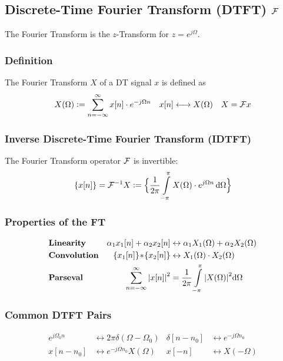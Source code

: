 \subsection{Discrete-Time Fourier Transform (DTFT) \texorpdfstring{\hfill $\mathcal{F}$}{ft}}
    The Fourier Transform is the $z$-Transform for $z=e^{j \Omega}$.
    \subsubsection{Definition}
        The Fourier Transform $X$ of a DT signal $x$ is defined as
        \begin{align*}
            X(\Omega) \vcentcolon= \sum\limits_{n = -\infty}^\infty x[n] \cdot e^{-j\Omega n} && x[n] \longleftrightarrow X(\Omega) && X = \mathcal{F} x
        \end{align*}

    \subsubsection{Inverse Discrete-Time Fourier Transform (IDTFT)}
        The Fourier Transform operator $\mathcal{F}$ is invertible:
        \begin{align*}
            \{x[n]\} = \mathcal{F}^{-1} X \vcentcolon= \Bigl\{ \frac{1}{2\pi}\int\limits_{-\pi}^\pi X(\Omega) \cdot e^{j\Omega n}\, \dd\Omega \Bigr\}
        \end{align*}

    \subsubsection{Properties of the FT}
        \vspace{-1em}
        \begin{align*}
            &\text{\bf Linearity} & \alpha_1x_1[n] + \alpha_2x_2[n] &\leftrightarrow \alpha_1X_1(\Omega) + \alpha_2X_2(\Omega) \\
            &\text{\bf Convolution} & \{x_1[n]\} \!\ast\! \{x_2[n]\} &\leftrightarrow X_1(\Omega)\cdot X_2(\Omega) \\
            &\text{\bf Parseval} & \sum\limits_{n = -\infty}^\infty \abs{x[n]}^2 &= \frac{1}{2\pi} \int\limits_{-\pi}^\pi \abs{X(\Omega)}^2 \dd \Omega
        \end{align*}

    \subsubsection{Common DTFT Pairs}
        \vspace{-1em}
        \begin{align*}
            e^{j \Omega_0 n} &\longleftrightarrow 2\pi\delta(\Omega-\Omega_0) & \delta[n-n_0] &\longleftrightarrow e^{-j\Omega n_0}\\
            x[n-n_0] &\longleftrightarrow e^{-j\Omega n_0} X(\Omega) & x[-n] &\longleftrightarrow X(-\Omega)
        \end{align*}

